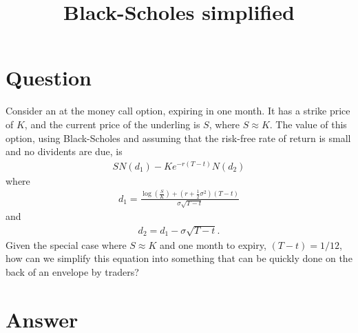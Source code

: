 \documentclass[11pt]{article}
\title{Black-Scholes simplified}
\author{}
\date{}
\begin{document}
\maketitle

\section{Question}

Consider an at the money call option, expiring in one month.
It has a strike price of $K$, and the current price of the underling is $S$, where $S \approx K$.
The value of this option, using Black-Scholes and assuming that the risk-free rate of return is small and no dividents are due, is
\begin{align*}
S N(d_1)
- K e^{-r(T-t)} N(d_2)
\end{align*}
where
\begin{align*}
 d_1 =
 \frac{
      \log\left( \frac{S}{K} \right)
      + \left( r + \frac{1}{2}\sigma^2  \right)(T - t)
 }{
 \sigma \sqrt{T - t}
 }
\end{align*}
and
\begin{align*}
 d_2 = d_1 - \sigma \sqrt{T - t}
 \text{.}
\end{align*}
Given the special case where $S \approx K$ and one month to expiry, $(T-t) = 1/12$, how can we simplify this equation into something that can be quickly done on the back of an envelope by traders?


\section{Answer}
\end{document}
